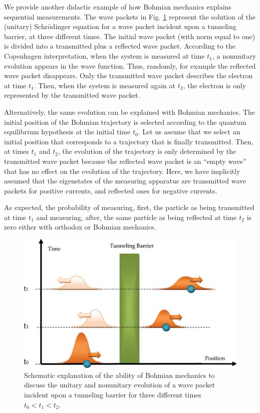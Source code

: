 \documentclass[nofootinbib, secnumarabic, amsmath, nobibnotes,10pt,aps,pra]{revtex4-1}
\newcommand{\fref}[1]{Fig. \ref{#1}}
\begin{document}
We provide another didactic example of how Bohmian
mechanics explains sequential measurements. The wave packets in
\fref{om_sequential} represent the solution of the (unitary)
Schr\"odinger equation for a wave packet incident upon a tunneling
barrier, at three different times. The initial wave packet (with norm
equal to one) is divided into a transmitted plus a reflected wave
packet. According to the Copenhagen interpretation, when the system
is measured at time $t_1$, a nonunitary evolution appears in the
wave function. Thus, randomly, for example the reflected wave packet disappears.
Only the transmitted wave packet describes the electron at time
$t_1$. Then, when the system is measured again at $t_2$, the
electron is only represented by the transmitted wave packet.\enlargethispage{13pt}


Alternatively, the same evolution can be
explained with Bohmian mechanics. The initial position of the
Bohmian trajectory is selected according to the quantum equilibrium hypothesis at the initial time $t_0$.
Let us assume that we select an initial position that corresponds to a trajectory that is finally transmitted. Then, at times $t_1$ and $t_2$, the evolution of the trajectory is
only determined by the transmitted wave packet because the reflected wave
packet is an ``empty wave'' that has no effect on the evolution of
the trajectory.  Here, we have implicitly assumed that the
eigenstates of the measuring apparatus are transmitted wave packets
for positive currents, and reflected ones for negative currents.

As expected, the probability of measuring, first, the particle as
being transmitted at time $t_1$ and measuring, after, the same
particle as being reflected at time $t_2$ is zero either with
orthodox or Bohmian mechanics.

\begin{figure}
\centering
\includegraphics[width=0.47\columnwidth]{F1_11.pdf}
\caption{Schematic explanation of the ability of Bohmian mechanics to discuss the
unitary and nonunitary evolution of a wave packet incident upon a
tunneling barrier for three different times $t_0 < t_1 < t_2$.}
\label{om_sequential}\vspace*{-6pt}
\end{figure}
\end{document}

